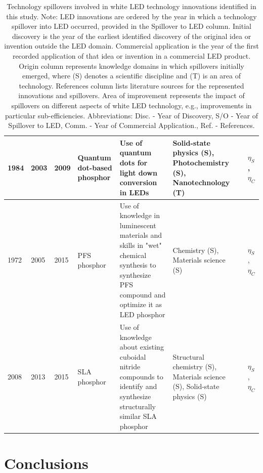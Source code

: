 \documentclass[twoside,twocolumn,9pt]{article}
\begin{document}
\begin{table}[h]
\begin{tabularx}{\textwidth}{|l|l|l|X|X|X|l|X|}
        1984 & 2003 & 2009 & Quantum dot-based phosphor & Use of quantum dots for light down conversion in LEDs & Solid-state physics (S), Photochemistry (S), Nanotechnology (T) &\cite{fojtik1984photo}\cite{simmonsfinal}\cite{ledprof_nexxusqd}\cite{bourzac2013quantum} & $\eta_S$, $\eta_C$ \\ \hline
        1972 & 2005 & 2015 & PFS phosphor & Use of knowledge in luminescent materials and skills in "wet" chemical synthesis to synthesize PFS compound and optimize it as LED phosphor & Chemistry (S), Materials science (S) &\cite{paulusz1973efficient}\cite{radkov2009red}\cite{Murphy2015} & $\eta_S$, $\eta_C$ \\ \hline
        2008 & 2013 & 2015 & SLA phosphor & Use of knowledge about existing cuboidal nitride compounds to identify and synthesize structurally similar SLA phosphor & Structural chemistry (S), Materials science (S), Solid-state physics (S) &\cite{Park2008New}\cite{schmidt2013new}\cite{Pust2014} & $\eta_S$, $\eta_C$ \\ \hline
    \end{tabularx}
    \caption{Technology spillovers involved in white LED technology innovations identified in this study. Note: LED innovations are ordered by the year in which a technology spillover into LED occurred, provided in the Spillover to LED column. Initial discovery is the year of the earliest identified discovery of the original idea or invention outside the LED domain. Commercial application is the year of the first recorded application of that idea or invention in a commercial LED product. Origin column represents knowledge domains in which spillovers initially emerged, where (S) denotes a scientific discipline and (T) is an area of technology. References column lists literature sources for the represented innovations and spillovers. Area of improvement represents the impact of spillovers on different aspects of white LED technology, e.g., improvements in particular sub-efficiencies. Abbreviations: Disc. - Year of Discovery, S/O - Year of Spillover to LED, Comm. - Year of Commercial Application., Ref. - References.}
    \label{tab:spillovers}
\end{table}

\section{Conclusions}
\end{document}
